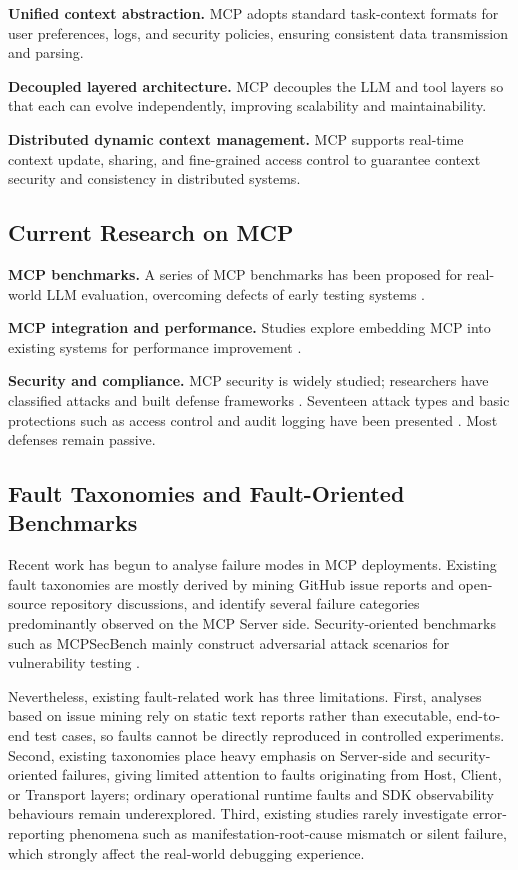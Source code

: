 \textbf{Unified context abstraction.} MCP adopts standard task-context formats for user
preferences, logs, and security policies, ensuring consistent data transmission and parsing.

\textbf{Decoupled layered architecture.} MCP decouples the LLM and tool layers so that each
can evolve independently, improving scalability and maintainability.

\textbf{Distributed dynamic context management.} MCP supports real-time context update,
sharing, and fine-grained access control to guarantee context security and consistency in
distributed systems.

\subsection{Current Research on MCP}

\textbf{MCP benchmarks.} A series of MCP benchmarks has been proposed for real-world LLM
evaluation, overcoming defects of early testing systems \cite{liu2025mcpeval}\cite{yang2025mcpsecbench}.

\textbf{MCP integration and performance.} Studies explore embedding MCP into existing systems
for performance improvement \cite{xu2025towards}\cite{li2025energyplus}\cite{da2025beyond}.

\textbf{Security and compliance.} MCP security is widely studied; researchers have classified
attacks and built defense frameworks \cite{hasan2025model}. Seventeen attack types and basic
protections such as access control and audit logging have been presented
\cite{yang2025mcpsecbench}\cite{mcpSecurity2025}\cite{fu2025mcp}. Most defenses remain passive.

\subsection{Fault Taxonomies and Fault-Oriented Benchmarks}

Recent work has begun to analyse failure modes in MCP deployments. Existing fault taxonomies
are mostly derived by mining GitHub issue reports and open-source repository discussions,
and identify several failure categories predominantly observed on the MCP Server side.
Security-oriented benchmarks such as MCPSecBench mainly construct adversarial attack
scenarios for vulnerability testing \cite{yang2025mcpsecbench}.

Nevertheless, existing fault-related work has three limitations. First, analyses based on
issue mining rely on static text reports rather than executable, end-to-end test cases, so
faults cannot be directly reproduced in controlled experiments. Second, existing taxonomies
place heavy emphasis on Server-side and security-oriented failures, giving limited attention
to faults originating from Host, Client, or Transport layers; ordinary operational runtime
faults and SDK observability behaviours remain underexplored. Third, existing studies
rarely investigate error-reporting phenomena such as manifestation-root-cause mismatch or
silent failure, which strongly affect the real-world debugging experience.

